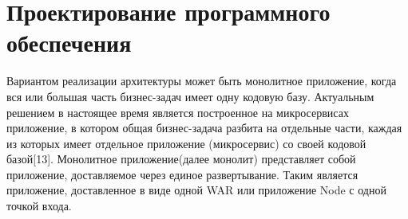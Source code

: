 \section{Проектирование программного обеспечения}

Вариантом реализации архитектуры может быть монолитное приложение, когда вся или большая часть бизнес-задач имеет одну кодовую базу.
Актуальным решением в настоящее время является построенное на микросервисах приложение, в котором общая бизнес-задача разбита на отдельные части, каждая из которых имеет отдельное приложение (микросервис) со своей кодовой базой[13].
\bigbreak
Монолитное приложение(далее монолит) представляет собой приложение, доставляемое через единое развертывание.
Таким является приложение, доставленное в виде одной WAR или приложение Node с одной точкой входа.

